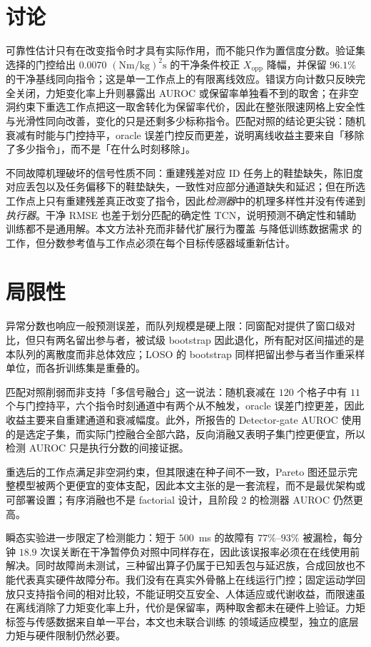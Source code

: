 \documentclass[UTF8]{ctexart}
\begin{document}
\section{讨论}

可靠性估计只有在改变指令时才具有实际作用，而不能只作为置信度分数。验证集选择的门控给出 $0.0070$ $(\mathrm{Nm/kg})^2\mathrm{s}$ 的干净条件校正 $X_{\mathrm{opp}}$ 降幅，并保留 $96.1\%$ 的干净基线同向指令；这是单一工作点上的有限离线效应。错误方向计数只反映完全关闭，力矩变化率上升则暴露出 AUROC 或保留率单独看不到的取舍；在非空洞约束下重选工作点把这一取舍转化为保留率代价，因此在整张限速网格上安全性与光滑性同向改善，变化的只是还剩多少标称指令。匹配对照的结论更尖锐：随机衰减有时能与门控持平，oracle 误差门控反而更差，说明离线收益主要来自「移除了多少指令」，而不是「在什么时刻移除」。

不同故障机理破坏的信号性质不同：重建残差对应 ID 任务上的鞋垫缺失，陈旧度对应丢包以及任务偏移下的鞋垫缺失，一致性对应部分通道缺失和延迟；但在所选工作点上只有重建残差真正改变了指令，因此\emph{检测器}中的机理多样性并没有传递到\emph{执行器}。干净 RMSE 也差于划分匹配的确定性 TCN，说明预测不确定性和辅助训练都不是通用解。本文方法补充而非替代扩展行为覆盖 \citep{molinaro2024task} 与降低训练数据需求 \citep{scherpereel2025domain} 的工作，但分数参考值与工作点必须在每个目标传感器域重新估计。

\section{局限性}

异常分数也响应一般预测误差，而队列规模是硬上限：同窗配对提供了窗口级对比，但只有两名留出参与者，被试级 bootstrap 因此退化，所有配对区间描述的是本队列的离散度而非总体效应；LOSO 的 bootstrap 同样把留出参与者当作重采样单位，而各折训练集是重叠的。

匹配对照削弱而非支持「多信号融合」这一说法：随机衰减在 $120$ 个格子中有 $11$ 个与门控持平，六个指令时刻通道中有两个从不触发，oracle 误差门控更差，因此收益主要来自重建通道和衰减幅度。此外，所报告的 Detector-gate AUROC 使用的是选定子集，而实际门控融合全部六路，反向消融又表明子集门控更便宜，所以检测 AUROC 只是执行分数的间接证据。

重选后的工作点满足非空洞约束，但其限速在种子间不一致，Pareto 图还显示完整模型被两个更便宜的变体支配，因此本文主张的是一套流程，而不是最优架构或可部署设置；有序消融也不是 factorial 设计，且阶段 2 的检测器 AUROC 仍然更高。

瞬态实验进一步限定了检测能力：短于 $500$~ms 的故障有 $77\%$--$93\%$ 被漏检，每分钟 $18.9$ 次误关断在干净暂停负对照中同样存在，因此该误报率必须在在线使用前解决。同时故障尚未测试，三种留出算子仍属于已知丢包与延迟族，合成回放也不能代表真实硬件故障分布。我们没有在真实外骨骼上在线运行门控；固定运动学回放只支持指令间的相对比较，不能证明交互安全、人体适应或代谢收益，而限速虽在离线消除了力矩变化率上升，代价是保留率，两种取舍都未在硬件上验证。力矩标签与传感数据来自单一平台，本文也未联合训练 \citet{scherpereel2025domain} 的领域适应模型，独立的底层力矩与硬件限制仍然必要。
\end{document}
